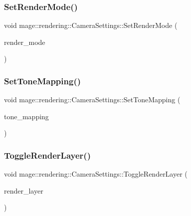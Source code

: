 \subsubsection{\texorpdfstring{Set\+Render\+Mode()}{SetRenderMode()}}
{\footnotesize\ttfamily void mage\+::rendering\+::\+Camera\+Settings\+::\+Set\+Render\+Mode (\begin{DoxyParamCaption}\item[{\hyperlink{namespacemage_1_1rendering_aeb14ce7610cc9391f4e01be027b91dcc}{Render\+Mode}}]{render\+\_\+mode }\end{DoxyParamCaption})\hspace{0.3cm}{\ttfamily [noexcept]}}

\hypertarget{classmage_1_1rendering_1_1_camera_settings_ab5dc52d8f8d92cf3c4f6aca126f6dc47}{}\label{classmage_1_1rendering_1_1_camera_settings_ab5dc52d8f8d92cf3c4f6aca126f6dc47} 
\subsubsection{\texorpdfstring{Set\+Tone\+Mapping()}{SetToneMapping()}}
{\footnotesize\ttfamily void mage\+::rendering\+::\+Camera\+Settings\+::\+Set\+Tone\+Mapping (\begin{DoxyParamCaption}\item[{\hyperlink{namespacemage_1_1rendering_a789e4b7d9a8cc831b065e9c6bb7430e9}{Tone\+Mapping}}]{tone\+\_\+mapping }\end{DoxyParamCaption})\hspace{0.3cm}{\ttfamily [noexcept]}}

\hypertarget{classmage_1_1rendering_1_1_camera_settings_a95c531aba7bbddba9ea47000de3c53b2}{}\label{classmage_1_1rendering_1_1_camera_settings_a95c531aba7bbddba9ea47000de3c53b2} 
\subsubsection{\texorpdfstring{Toggle\+Render\+Layer()}{ToggleRenderLayer()}}
{\footnotesize\ttfamily void mage\+::rendering\+::\+Camera\+Settings\+::\+Toggle\+Render\+Layer (\begin{DoxyParamCaption}\item[{\hyperlink{namespacemage_1_1rendering_a466c2a441ea5b26e4625c2f34e021b3d}{Render\+Layer}}]{render\+\_\+layer }\end{DoxyParamCaption})\hspace{0.3cm}{\ttfamily [noexcept]}}




